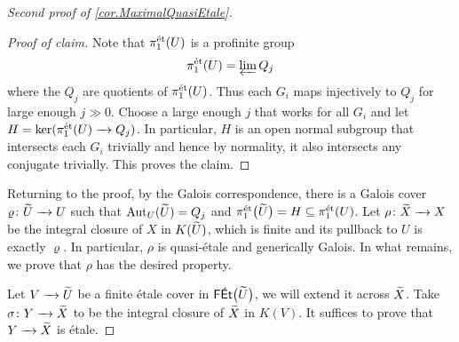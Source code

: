 \documentclass[12pt]{amsart}
\numberwithin{equation}{theorem}
\renewcommand{\:}{\colon}
\newcommand{\piet}{\pi_1^{\textnormal{\'{e}t}}} %
\theoremstyle{theorem}
\renewcommand{\O}{\mathscr O}
\begin{document}
\begin{proof} [Second proof of \autoref{cor.MaximalQuasiEtale}]
\begin{proof}[Proof of claim]
Note that $\pi_1^{\textnormal{{\'e}t}}(U)$ is a profinite group
\[ \pi_1^{\textnormal{{\'e}t}}(U) = \varprojlim Q_j \]
where the $Q_j$ are quotients of $\pi_1^{\textnormal{{\'e}t}}(U)$.
Thus each $G_i$ maps injectively to $Q_j$ for large enough $j \gg 0$.
Choose a large enough $j$ that works for all $G_i$ and let $H = \ker(\pi_1^{\textnormal{{\'e}t}}(U) \xrightarrow{\ \ } Q_j)$.
In particular, $H$ is an open normal subgroup that intersects each $G_i$ trivially and hence by normality, it also intersects any conjugate trivially.
This proves the claim.
\end{proof}

Returning to the proof, by the Galois correspondence, there is a Galois cover $\varrho\colon \widetilde U \xrightarrow{\ \ } U$ such that $\operatorname{Aut}_U(\widetilde U) = Q_j$ and $\pi_1^{\et}\bigl(\tld U\bigr) = H \subseteq \piet(U)$. %
Let $\rho\colon \widetilde X \xrightarrow{\ \ } X$ be the integral closure of $X$ in $K(\widetilde U)$, which is finite and its pullback to $U$ is exactly $\varrho$.
In particular, $\rho$ is quasi-\'etale and generically Galois.
In what remains, we prove that $\rho$ has the desired property. %

Let $V\xrightarrow{\ \ } \widetilde U$ be a finite \'etale cover in $\textsf{F\'{E}t}\bigl(\widetilde U\bigr)$, we will extend it across $\widetilde X$. %
Take $\sigma\colon Y \xrightarrow{\ \ } \widetilde X$ to be the integral closure of $\widetilde X$ in $K(V)$. %
It suffices to prove that $Y \xrightarrow{\ \ } \widetilde X$ is \'etale.


\end{proof}
\end{document}
